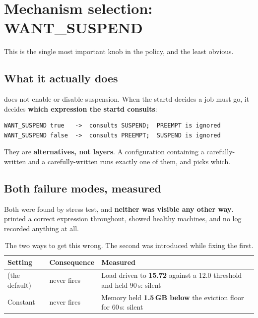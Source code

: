 \chapter{Mechanism selection: WANT\_SUSPEND}
\label{ch:mechanism}

This is the single most important knob in the policy, and the least obvious.

\section{What it actually does}

 does not enable or disable suspension. When the startd decides
a job must go, it decides \textbf{which expression the startd consults}:

\begin{lstlisting}
WANT_SUSPEND true   ->  consults SUSPEND;  PREEMPT is ignored
WANT_SUSPEND false  ->  consults PREEMPT;  SUSPEND is ignored
\end{lstlisting}

\begin{keypoint}
They are \textbf{alternatives, not layers}. A configuration containing a
carefully-written  and a carefully-written  runs exactly
one of them, and  picks which.
\end{keypoint}

\section{Both failure modes, measured}

Both were found by stress test, and \textbf{neither was visible any other way}.
 printed a correct expression throughout,
 showed healthy machines, and no log recorded anything at all.

\begin{table}[H]
\centering
\begin{tabularx}{\textwidth}{L{0.20\textwidth} L{0.24\textwidth} Y}
\toprule
\textbf{Setting} & \textbf{Consequence} & \textbf{Measured} \\
\midrule
{} (the default) &  never fires & Load driven to \textbf{15.72} against a 12.0 threshold and held 90\,s: silent \\
Constant  &  never fires & Memory held \textbf{1.5\,GB below} the eviction floor for 60\,s: silent \\
\bottomrule
\end{tabularx}
\caption{The two ways to get this wrong. The second was introduced while fixing the first.}
\end{table}

